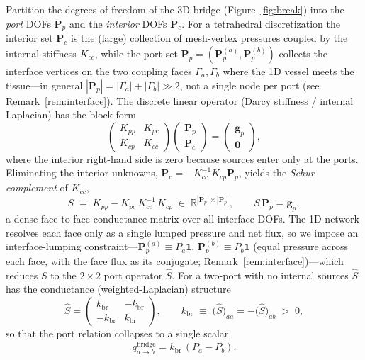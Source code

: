 \documentclass[11pt]{article}
\newcommand{\kbr}{k_{\mathrm{br}}}
\begin{document}
Partition the degrees of freedom of the 3D bridge (Figure~\ref{fig:break}) into the
\emph{port} DOFs $\bm{P}_p$ and the \emph{interior} DOFs $\bm{P}_c$. For a
tetrahedral discretization the interior set $\bm{P}_c$ is the (large) collection of
mesh-vertex pressures coupled by the internal stiffness $K_{cc}$, while the port set
$\bm{P}_p=(\bm{P}_p^{(a)},\bm{P}_p^{(b)})$ collects the interface vertices on the two
coupling faces $\Gamma_a,\Gamma_b$ where the 1D vessel meets the tissue---in general
$|\bm{P}_p|=|\Gamma_a|+|\Gamma_b|\gg 2$, not a single node per port
(see Remark~\ref{rem:interface}). The discrete linear operator (Darcy stiffness /
internal Laplacian) has the block form
\begin{equation}
\begin{pmatrix} K_{pp} & K_{pc} \\ K_{cp} & K_{cc} \end{pmatrix}
\begin{pmatrix} \bm{P}_p \\ \bm{P}_c \end{pmatrix}
=
\begin{pmatrix} \bm{g}_p \\ \bm{0} \end{pmatrix},
\label{eq:blockbridge}
\end{equation}
where the interior right-hand side is zero because sources enter only at the ports.
Eliminating the interior unknowns, $\bm{P}_c = -K_{cc}^{-1}K_{cp}\bm{P}_p$, yields
the \emph{Schur complement} of $K_{cc}$,
\begin{equation}
S \;=\; K_{pp} - K_{pc}\,K_{cc}^{-1}\,K_{cp}
\;\in\;\mathbb{R}^{|\bm{P}_p|\times|\bm{P}_p|},
\qquad
S\,\bm{P}_p = \bm{g}_p,
\label{eq:schur}
\end{equation}
a dense face-to-face conductance matrix over all interface DOFs. The 1D network
resolves each face only as a single lumped pressure and net flux, so we impose an
interface-lumping constraint---$\bm{P}_p^{(a)}\!\equiv\!P_a\bm{1}$,
$\bm{P}_p^{(b)}\!\equiv\!P_b\bm{1}$ (equal pressure across each face, with the face
flux as its conjugate; Remark~\ref{rem:interface})---which reduces $S$ to the
$2\times2$ port operator $\hat S$. For a two-port with no internal sources $\hat S$
has the conductance (weighted-Laplacian) structure
\begin{equation}
\hat S =
\begin{pmatrix} \kbr & -\kbr \\ -\kbr & \kbr \end{pmatrix},
\qquad
\kbr \;\equiv\; \bigl(\hat S\bigr)_{aa} = -\bigl(\hat S\bigr)_{ab} \;>\;0,
\label{eq:kbr}
\end{equation}
so that the port relation collapses to a single scalar,
\begin{equation}
\boxed{\;q_{a\to b}^{\mathrm{bridge}} = \kbr\,(P_a - P_b).\;}
\label{eq:portlaw}
\end{equation}
\end{document}

